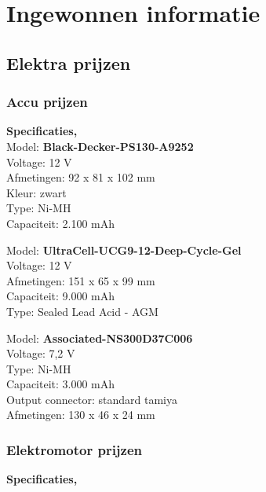 \chapter{Ingewonnen informatie}
\label{cha:bijlage_C}

\section{Elektra prijzen}

\subsection{Accu prijzen}
\vspace{\baselineskip}

\textbf{Specificaties, \cite{Conrad}}\\

Model: \textbf{Black-Decker-PS130-A9252}\\
Voltage:	12 V	\\
Afmetingen:	92 x 81 x 102 mm \\
Kleur:	zwart	\\
Type:	Ni-MH \\
Capaciteit:	2.100 mAh \\
\vspace{\baselineskip}

Model: \textbf{UltraCell-UCG9-12-Deep-Cycle-Gel} \\
Voltage:	12 V	\\
Afmetingen:	151 x 65 x 99 mm \\
Capaciteit:	9.000 mAh	\\
Type:	Sealed Lead Acid - AGM \\
\vspace{\baselineskip}

Model:  \textbf{Associated-NS300D37C006} \\
Voltage:	7,2 V	\\
Type:	Ni-MH\\
Capaciteit:	3.000 mAh	\\
Output connector:	standard tamiya \\
Afmetingen:	130 x 46 x 24 mm \\

\subsection{Elektromotor prijzen}
\vspace{\baselineskip}

\textbf{Specificaties, \cite{Conrad}}
\vspace{\baselineskip}

